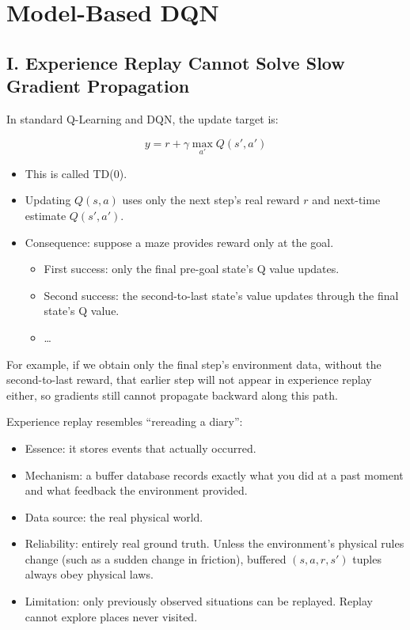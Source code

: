 \setcounter{section}{7}

\hypertarget{model-based-dqn}{%
\section{Model-Based DQN}\label{model-based-dqn}}

\hypertarget{i.-experience-replay-cannot-solve-slow-gradient-propagation}{%
\subsection{I. Experience Replay Cannot Solve Slow Gradient Propagation}\label{i.-experience-replay-cannot-solve-slow-gradient-propagation}}

In standard Q-Learning and DQN, the update target is:

\[
y=r+\gamma \max_{a'}Q(s',a')
\]

\begin{itemize}
\tightlist
\item
  This is called TD(0).
\item
  Updating \(Q(s,a)\) uses only the next step's real reward \(r\) and next-time estimate \(Q(s',a')\).
\item
  Consequence: suppose a maze provides reward only at the goal.

  \begin{itemize}
  \tightlist
  \item
    First success: only the final pre-goal state's Q value updates.
  \item
    Second success: the second-to-last state's value updates through the final state's Q value.
  \item
    \ldots{}
  \end{itemize}
\end{itemize}

For example, if we obtain only the final step's environment data, without the second-to-last reward, that earlier step will not appear in experience replay either, so gradients still cannot propagate backward along this path.

Experience replay resembles ``rereading a diary'':

\begin{itemize}
\tightlist
\item
  Essence: it stores events that actually occurred.
\item
  Mechanism: a buffer database records exactly what you did at a past moment and what feedback the environment provided.
\item
  Data source: the real physical world.
\item
  Reliability: entirely real ground truth. Unless the environment's physical rules change (such as a sudden change in friction), buffered \((s,a,r,s')\) tuples always obey physical laws.
\item
  Limitation: only previously observed situations can be replayed. Replay cannot explore places never visited.
\end{itemize}

